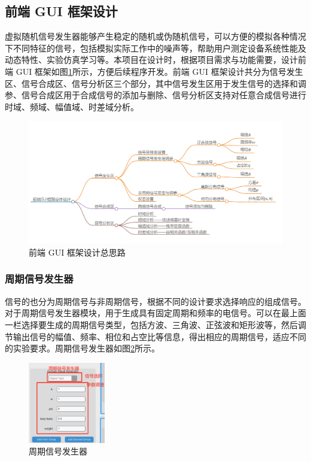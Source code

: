 \documentclass[12pt]{ctexart}
\begin{document}
\subsection{前端 GUI 框架设计}

虚拟随机信号发生器能够产生稳定的随机或伪随机信号，可以方便的模拟各种情况下不同特征的信号，包括模拟实际工作中的噪声等，帮助用户测定设备系统性能及动态特性、实验仿真学习等。本项目在设计时，根据项目需求与功能需要，设计前端 GUI 框架如图\ref{figure1}所示，方便后续程序开发。前端 GUI 框架设计共分为信号发生区、信号合成区、信号分析区三个部分，其中信号发生区用于发生信号的选择和调参、信号合成区用于合成信号的添加与删除、信号分析区支持对任意合成信号进行时域、频域、幅值域、时差域分析。

\begin{figure}[htbp]
  \centering
  \includegraphics[width=\textwidth]{img/major_framework.png}
  \caption{前端 GUI 框架设计总思路}\label{figure1}
\end{figure}

\subsubsection{周期信号发生器}
信号的也分为周期信号与非周期信号，根据不同的设计要求选择响应的组成信号。对于周期信号发生器模块，用于生成具有固定周期和频率的电信号。可以在最上面一栏选择要生成的周期信号类型，包括方波、三角波、正弦波和矩形波等，然后调节输出信号的幅值、频率、相位和占空比等信息，得出相应的周期信号，适应不同的实验要求。周期信号发生器如图\ref{figure7}所示。
\begin{figure}[t]
  \centering
  \includegraphics[width=0.3\textwidth]{img/Periodic_signal_genarator.png}
  \caption{周期信号发生器}\label{figure7}
\end{figure}
\end{document}
